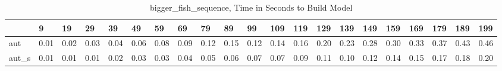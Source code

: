 \begin{table}
\caption{bigger_fish_sequence, Time in Seconds to Build Model}
\label{bigger_fish_sequence_model_time}
\begin{tabular}{lllllllllllllllllllll}
\toprule
 & 9 & 19 & 29 & 39 & 49 & 59 & 69 & 79 & 89 & 99 & 109 & 119 & 129 & 139 & 149 & 159 & 169 & 179 & 189 & 199 \\
\midrule
aut & 0.01 & 0.02 & 0.03 & 0.04 & 0.06 & 0.08 & 0.09 & 0.12 & 0.15 & 0.12 & 0.14 & 0.16 & 0.20 & 0.23 & 0.28 & 0.30 & 0.33 & 0.37 & 0.43 & 0.46 \\
aut_s & 0.01 & 0.01 & 0.01 & 0.02 & 0.03 & 0.03 & 0.04 & 0.05 & 0.06 & 0.07 & 0.07 & 0.09 & 0.11 & 0.10 & 0.12 & 0.14 & 0.15 & 0.17 & 0.18 & 0.20 \\
\bottomrule
\end{tabular}
\end{table}
